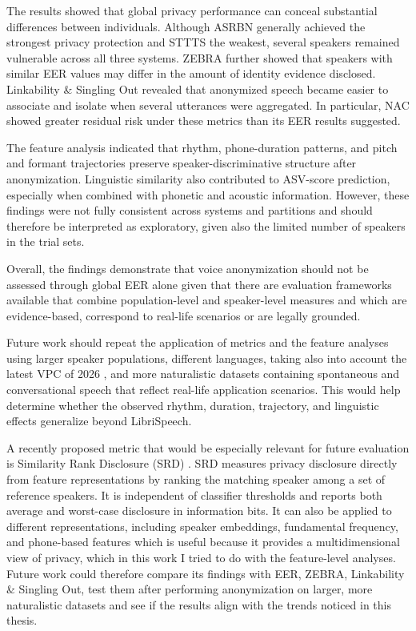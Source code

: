 \documentclass[12pt,leqno,a4paper]{article}
\begin{document}
The results showed that global privacy performance can conceal substantial differences between individuals. Although ASRBN generally achieved the strongest privacy protection and STTTS the weakest, 
several speakers remained vulnerable across all three systems. ZEBRA further showed that speakers with similar EER values may differ in the amount of identity evidence disclosed. 
Linkability \& Singling Out revealed that anonymized speech became easier to associate and isolate when several utterances were aggregated. In particular, NAC showed greater residual risk under these metrics than its EER results suggested.

The feature analysis indicated that rhythm, phone-duration patterns, and pitch and formant trajectories preserve speaker-discriminative structure after anonymization. 
Linguistic similarity also contributed to ASV-score prediction, especially when combined with phonetic and acoustic information. However, these findings were not fully consistent across systems and partitions and should therefore be interpreted as exploratory, given also the limited number of speakers in the trial sets.

Overall, the findings demonstrate that voice anonymization should not be assessed through global EER alone given that there are evaluation frameworks available that combine population-level and speaker-level measures and which are evidence-based, correspond to real-life scenarios or are legally grounded. 

Future work should repeat the application of metrics and the feature analyses using larger speaker populations, different languages, taking also into account the latest VPC of 2026 \citep{voiceprivacy2026}, and more naturalistic datasets containing spontaneous and conversational speech that reflect real-life application scenarios. 
This would help determine whether the observed rhythm, duration, trajectory, and linguistic effects generalize beyond LibriSpeech.

A recently proposed metric that would be especially relevant for future evaluation is Similarity Rank Disclosure (SRD) \citep{chandra2026evaluatingvoiceanonymisationusing}. SRD measures privacy disclosure directly from feature representations by ranking the matching speaker among a set of reference speakers. 
It is independent of classifier thresholds and reports both average and worst-case disclosure in information bits. 
It can also be applied to different representations, including speaker embeddings, fundamental frequency, and phone-based features which is useful because it provides a multidimensional view of privacy, which in this work I tried to do with the feature-level analyses. 
Future work could therefore compare its findings with EER, ZEBRA, Linkability \& Singling Out, test them after performing anonymization on larger, more naturalistic datasets and see if the results align with the trends noticed in this thesis. 
\end{document}
